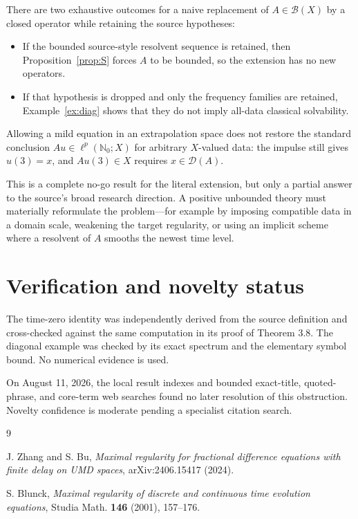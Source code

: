 \documentclass[11pt]{article}
\newcommand{\N}{\mathbb N}
\newcommand{\D}{\mathcal D}
\begin{document}
There are two exhaustive outcomes for a naive replacement of
$A\in\mathcal B(X)$ by a closed operator while retaining the source
hypotheses:

\begin{itemize}
\item If the bounded source-style resolvent sequence is retained, then
Proposition~\ref{prop:S} forces $A$ to be bounded, so the extension has no new
operators.
\item If that hypothesis is dropped and only the frequency families are
retained, Example~\ref{ex:diag} shows that they do not imply all-data
classical solvability.
\end{itemize}

Allowing a mild equation in an extrapolation space does not restore the
standard conclusion $Au\in\ell^p(\N_0;X)$ for arbitrary $X$-valued data:
the impulse still gives $u(3)=x$, and $Au(3)\in X$ requires $x\in\D(A)$.

This is a complete no-go result for the literal extension, but only a partial
answer to the source's broad research direction. A positive unbounded theory
must materially reformulate the problem---for example by imposing compatible
data in a domain scale, weakening the target regularity, or using an implicit
scheme where a resolvent of $A$ smooths the newest time level.

\section{Verification and novelty status}

The time-zero identity was independently derived from the source definition
and cross-checked against the same computation in its proof of Theorem 3.8.
The diagonal example was checked by its exact spectrum and the elementary
symbol bound. No numerical evidence is used.

On August 11, 2026, the local result indexes and bounded exact-title,
quoted-phrase, and core-term web searches found no later resolution of this
obstruction. Novelty confidence is moderate pending a specialist citation
search.

\begin{thebibliography}{9}

J. Zhang and S. Bu,
\emph{Maximal regularity for fractional difference equations with finite
delay on UMD spaces},
arXiv:2406.15417 (2024).

S. Blunck,
\emph{Maximal regularity of discrete and continuous time evolution
equations},
Studia Math. \textbf{146} (2001), 157--176.

\end{thebibliography}
\end{document}
